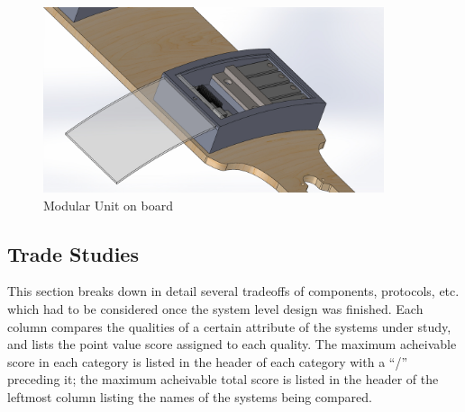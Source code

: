 \documentclass[titlepage, letterpaper,12pt]{article}
\begin{document}
\begin{figure}[!h]
    \centering
    \includegraphics[width=10cm]{figs/ModularAssembledZoomModOpen.JPG}
    \caption{Modular Unit on board}
    \label{fig:picTiny}
\end{figure}


\subsection{Trade Studies}
This section breaks down in detail several tradeoffs of components, protocols, etc. which had to be considered once the system level design was finished. Each column compares the qualities of a certain attribute of the systems under study, and lists the point value score assigned to each quality. The maximum acheivable score in each category is listed in the header of each category with a ``/'' preceding it; the maximum acheivable total score is listed in the header of the leftmost column listing the names of the systems being compared.
\end{document}
